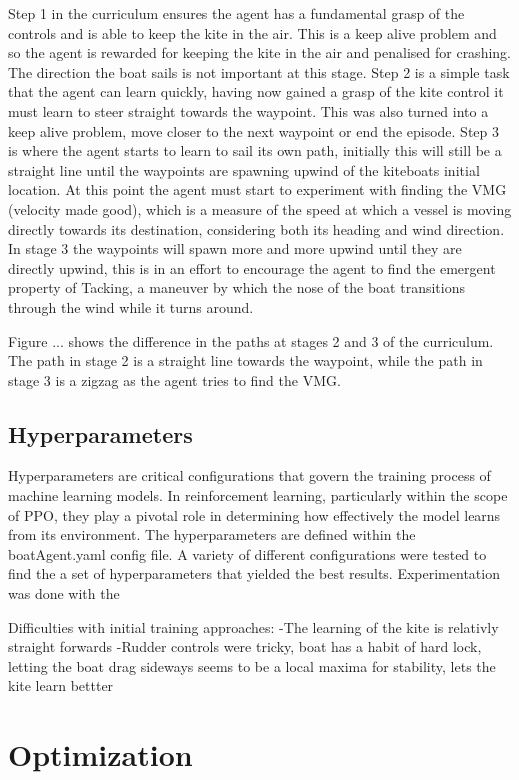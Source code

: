 Step 1 in the curriculum ensures the agent has a fundamental grasp of the controls and is able to keep the kite in the air. This is a keep alive problem and so the agent is rewarded for keeping the kite in the air and penalised for crashing. The direction the boat sails is not important at this stage. Step 2 is a simple task that the agent can learn quickly, having now gained a grasp of the kite control it must learn to steer straight towards the waypoint. This was also turned into a keep alive problem, move closer to the next waypoint or end the episode. Step 3 is where the agent starts to learn to sail its own path, initially this will still be a straight line until the waypoints are spawning upwind of the kiteboats initial location. At this point the agent must start to experiment with finding the VMG (velocity made good), which is a measure of the speed at which a vessel is moving directly towards its destination, considering both its heading and wind direction. In stage 3 the waypoints will spawn more and more upwind until they are directly upwind, this is in an effort to encourage the agent to find the emergent property of Tacking, a maneuver by which the nose of the boat transitions through the wind while it turns around.  

Figure ... shows the difference in the paths at stages 2 and 3 of the curriculum. The path in stage 2 is a straight line towards the waypoint, while the path in stage 3 is a zigzag as the agent tries to find the VMG. 

\subsection{Hyperparameters}\label{sec:hyperparameters}
Hyperparameters are critical configurations that govern the training process of machine learning models. In reinforcement learning, particularly within the scope of PPO, they play a pivotal role in determining how effectively the model learns from its environment. The hyperparameters are defined within the boatAgent.yaml config file. A variety of different configurations were tested to find the a set of hyperparameters that yielded the best results. Experimentation was done with the 


Difficulties with initial training approaches:
-The learning of the kite is relativly straight forwards
-Rudder controls were tricky, boat has a habit of hard lock, letting the boat drag sideways seems to be a local maxima for stability,  lets the kite learn bettter
\section{Optimization}


